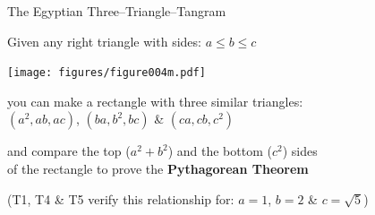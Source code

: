 \documentclass[14pt]{beamer}
\begin{document}
    \begin{frame}{The Egyptian Three--Triangle--Tangram}
        \begin{center}
            Given any right triangle with sides: {\small $a \leq b \leq c$}

            \bigskip\bigskip

            \texttt{[image: figures/figure004m.pdf]}

            \bigskip
            
            {\small you can make a rectangle with three similar triangles:\\{\footnotesize $(a^{2},ab,ac)$,\; $(ba,b^{2},bc)$\; \&\; $(ca,cb,c^{2})$}\\\bigskip

            and compare the top {\footnotesize($a^{2}\!+\!b^{2}$)} and the bottom {\footnotesize($c^{2}$)} sides\\of the rectangle to prove the \textbf{Pythagorean Theorem}}

            \bigskip

            {\footnotesize (T1, T4 \& T5 verify this relationship for: $a=1$,\; $b=2$\; \&\; $c=\sqrt{5}$)}
        \end{center}
    \end{frame}

\end{document}
